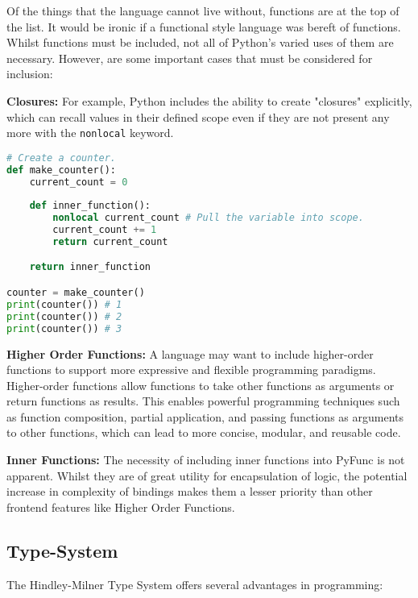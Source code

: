 \documentclass{l4proj}
\begin{document}
Of the things that the language cannot live without, functions are at the top of the list.
It would be ironic if a functional style language was bereft of functions.
Whilst functions must be included, not all of Python's varied uses of them are necessary.
However, are some important cases that must be considered for inclusion:

\textbf{Closures: }For example, Python includes the ability to create "closures" explicitly, which can recall values in their defined scope even if they are not present any more with the \texttt{nonlocal} keyword.

\begin{lstlisting}[language=Python, caption={An example of a closure in Python. See the use of the 'nonlocal' keyword to pull the surrounding defintion of 'current\_count' into the scope of 'inner\_function'.}, label={lst:py-closure}]
# Create a counter.
def make_counter():
    current_count = 0
    
    def inner_function():
        nonlocal current_count # Pull the variable into scope.
        current_count += 1
        return current_count

    return inner_function

counter = make_counter()
print(counter()) # 1
print(counter()) # 2
print(counter()) # 3
\end{lstlisting}


\textbf{Higher Order Functions:}
A language may want to include higher-order functions to support more expressive and flexible programming paradigms. 
Higher-order functions allow functions to take other functions as arguments or return functions as results.
This enables powerful programming techniques such as function composition, partial application, and passing functions as arguments to other functions, which can lead to more concise, modular, and reusable code.

\textbf{Inner Functions:}
The necessity of including inner functions into PyFunc is not apparent.
Whilst they are of great utility for encapsulation of logic, the potential increase in complexity of bindings makes them a lesser priority than other frontend features like Higher Order Functions.

\subsection{Type-System}
The Hindley-Milner Type System offers several advantages in programming:
\end{document}
